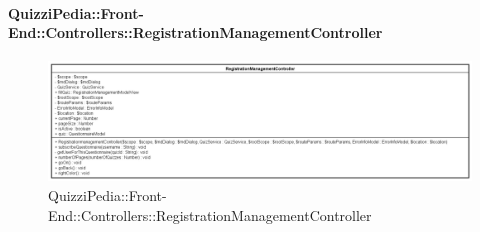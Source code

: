 \paragraph[QuizziPedia::Front-End::Controllers\\::RegistrationManagementController]{QuizziPedia::Front-End::Controllers::RegistrationManagementController}
\begin{figure} [ht]
	\centering
	\includegraphics[scale=0.3]{UML/Classi/Front-End/QuizziPedia_Front-end_Controller_RegistrationManagementController.png}
	\caption{QuizziPedia::Front-End::Controllers::RegistrationManagementController}
\end{figure} \FloatBarrier

